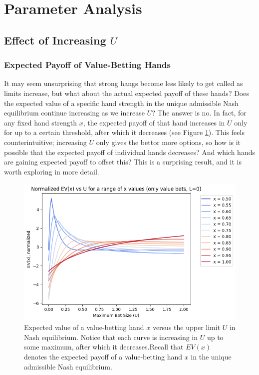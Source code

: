 \documentclass[../../main/main.tex]{subfiles}
\begin{document}
\section{Parameter Analysis}

\subsection{Effect of Increasing $U$}

\subsubsection{Expected Payoff of Value-Betting Hands}

It may seem unsurprising that strong hangs become less likely to get called as limits increase, but what about the actual expected payoff of these hands? Does the expected value of a specific hand strength in the unique admissible Nash equilibrium continue increasing as we increase $U$? The answer is no. In fact, for any fixed hand strength $x$, the expected payoff of that hand increases in $U$ only for up to a certain threshold, after which it decreases (see Figure \ref{fig:ev_x_vs_U}). This feels counterintuitive; increasing $U$ only gives the bettor more options, so how is it possible that the expected payoff of individual hands decreases? And which hands are gaining expected payoff to offset this? This is a surprising result, and it is worth exploring in more detail.

\begin{figure}[h!]
    \centering
    \includegraphics[width=\textwidth]{images/ev_vs_U.png}
    \caption{Expected value of a value-betting hand $x$ versus the upper limit $U$ in Nash equilibrium. Notice that each curve is increasing in $U$ up to some maximum, after which it decreases.Recall that $EV(x)$ denotes the expected payoff of a value-betting hand $x$ in the unique admissible Nash equilibrium.}
    \label{fig:ev_x_vs_U}
\end{figure}
\end{document}
